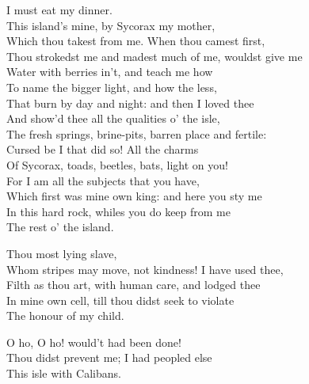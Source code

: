 \begin{verse_speech}[Caliban] 
I must eat my dinner.\\
This island's mine, by Sycorax my mother,\\
Which thou takest from me. When thou camest first,\\
Thou strokedst me and madest much of me, wouldst give me\\
Water with berries in't, and teach me how\\
To name the bigger light, and how the less,\\
That burn by day and night: and then I loved thee\\
And show'd thee all the qualities o' the isle,\\
The fresh springs, brine-pits, barren place and fertile:\\
Cursed be I that did so! All the charms\\
Of Sycorax, toads, beetles, bats, light on you!\\
For I am all the subjects that you have,\\
Which first was mine own king: and here you sty me\\
In this hard rock, whiles you do keep from me\\
The rest o' the island.
\end{verse_speech}

\begin{verse_speech}[Prospero] 
Thou most lying slave,\\
Whom stripes may move, not kindness! I have used thee,\\
Filth as thou art, with human care, and lodged thee\\
In mine own cell, till thou didst seek to violate\\
The honour of my child.
\end{verse_speech}

\begin{verse_speech}[Caliban]
O ho, O ho! would't had been done!\\
Thou didst prevent me; I had peopled else\\
This isle with Calibans.
\end{verse_speech}

